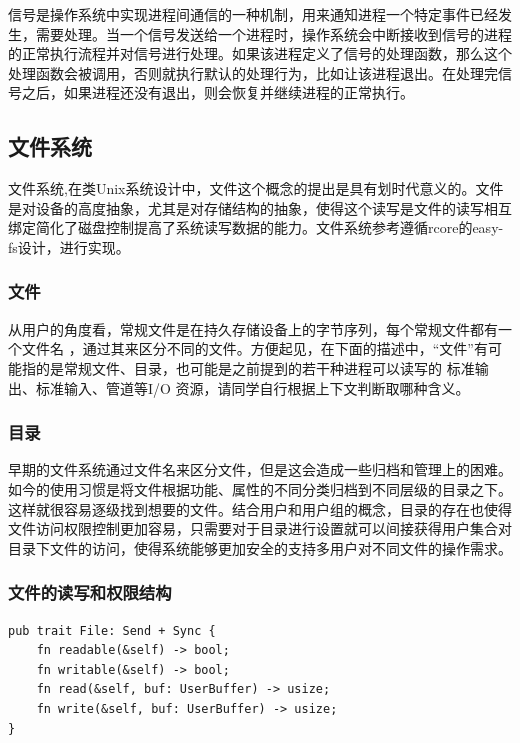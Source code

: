 信号是操作系统中实现进程间通信的一种机制，用来通知进程一个特定事件已经发生，需要处理。当一个信号发送给一个进程时，操作系统会中断接收到信号的进程的正常执行流程并对信号进行处理。如果该进程定义了信号的处理函数，那么这个处理函数会被调用，否则就执行默认的处理行为，比如让该进程退出。在处理完信号之后，如果进程还没有退出，则会恢复并继续进程的正常执行。

\subsection{文件系统}

文件系统,在类Unix系统设计中，文件这个概念的提出是具有划时代意义的。文件是对设备的高度抽象，尤其是对存储结构的抽象，使得这个读写是文件的读写相互绑定简化了磁盘控制提高了系统读写数据的能力。文件系统参考遵循rcore的easy-fs设计，进行实现。

\subsubsection{文件}

从用户的角度看，常规文件是在持久存储设备上的字节序列，每个常规文件都有一个文件名 ，通过其来区分不同的文件。方便起见，在下面的描述中，“文件”有可能指的是常规文件、目录，也可能是之前提到的若干种进程可以读写的 标准输出、标准输入、管道等I/O 资源，请同学自行根据上下文判断取哪种含义。

\subsubsection{目录}

早期的文件系统通过文件名来区分文件，但是这会造成一些归档和管理上的困难。如今的使用习惯是将文件根据功能、属性的不同分类归档到不同层级的目录之下。这样就很容易逐级找到想要的文件。结合用户和用户组的概念，目录的存在也使得文件访问权限控制更加容易，只需要对于目录进行设置就可以间接获得用户集合对目录下文件的访问，使得系统能够更加安全的支持多用户对不同文件的操作需求。

\subsubsection{文件的读写和权限结构}

\begin{lstlisting}[caption=文件系统基本读写]
pub trait File: Send + Sync {
    fn readable(&self) -> bool;
    fn writable(&self) -> bool;
    fn read(&self, buf: UserBuffer) -> usize;
    fn write(&self, buf: UserBuffer) -> usize;
}
\end{lstlisting}

